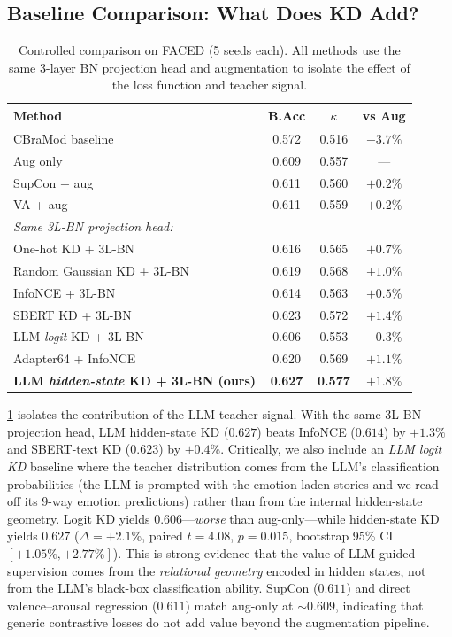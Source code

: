 \subsection{Baseline Comparison: What Does KD Add?}
\label{sec:baseline_ablation}
\vspace{-1mm}

\begin{table}[!t]
\caption{Controlled comparison on FACED (5 seeds each). All methods use the same 3-layer BN projection head and augmentation to isolate the effect of the loss function and teacher signal.}
\small
\centering
\setlength{\tabcolsep}{5pt}
\begin{tabular}{lccc}
\toprule
Method & B.Acc & $\kappa$ & vs Aug \\
\midrule
CBraMod baseline & 0.572 & 0.516 & $-3.7\%$ \\
Aug only & 0.609 & 0.557 & --- \\
SupCon + aug & 0.611 & 0.560 & $+0.2\%$ \\
VA + aug & 0.611 & 0.559 & $+0.2\%$ \\
\midrule
\multicolumn{4}{l}{\textit{Same 3L-BN projection head:}} \\
One-hot KD + 3L-BN & 0.616 & 0.565 & $+0.7\%$ \\
Random Gaussian KD + 3L-BN & 0.619 & 0.568 & $+1.0\%$ \\
InfoNCE + 3L-BN & 0.614 & 0.563 & $+0.5\%$ \\
SBERT KD + 3L-BN & 0.623 & 0.572 & $+1.4\%$ \\
LLM \emph{logit} KD + 3L-BN & 0.606 & 0.553 & $-0.3\%$ \\
Adapter64 + InfoNCE & 0.620 & 0.569 & $+1.1\%$ \\
\rowcolor{blond}
\textbf{LLM \emph{hidden-state} KD + 3L-BN (ours)} & \textbf{0.627} & \textbf{0.577} & $\mathbf{+1.8\%}$ \\
\bottomrule
\end{tabular}
\label{tab:baselines}
\end{table}

\cref{tab:baselines} isolates the contribution of the LLM teacher signal. With the same 3L-BN projection head, LLM hidden-state KD ($0.627$) beats InfoNCE ($0.614$) by $+1.3\%$ and SBERT-text KD ($0.623$) by $+0.4\%$. Critically, we also include an \emph{LLM logit KD} baseline where the teacher distribution comes from the LLM's classification probabilities (the LLM is prompted with the emotion-laden stories and we read off its 9-way emotion predictions) rather than from the internal hidden-state geometry. Logit KD yields $0.606$---\emph{worse} than aug-only---while hidden-state KD yields $0.627$ ($\Delta = +2.1\%$, paired $t = 4.08$, $p = 0.015$, bootstrap 95\% CI $[+1.05\%, +2.77\%]$). This is strong evidence that the value of LLM-guided supervision comes from the \emph{relational geometry} encoded in hidden states, not from the LLM's black-box classification ability. SupCon ($0.611$) and direct valence--arousal regression ($0.611$) match aug-only at $\sim$$0.609$, indicating that generic contrastive losses do not add value beyond the augmentation pipeline.

